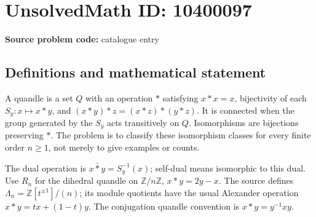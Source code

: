 \documentclass[11pt]{article}
\newcommand{\Z}{\mathbb{Z}}
\begin{document}
\section*{UnsolvedMath ID: 10400097}
\textbf{Source problem code:} catalogue entry
\subsection{Definitions and mathematical statement}
A quandle is a set \(Q\) with an operation \(*\) satisfying \(x*x=x\), bijectivity of each \(S_y:x\mapsto x*y\), and \((x*y)*z=(x*z)*(y*z)\). It is connected when the group generated by the \(S_y\) acts transitively on \(Q\). Isomorphisms are bijections preserving \(*\). The problem is to classify these isomorphism classes for every finite order \(n\geq1\), not merely to give examples or counts.

The dual operation is \(x\mathbin{\bar *}y=S_y^{-1}(x)\); self-dual means isomorphic to this dual. Use \(R_n\) for the dihedral quandle on \(\Z/n\Z\), \(x*y=2y-x\). The source defines \(\Lambda_n=\Z[t^{\pm1}]/(n)\); its module quotients have the usual Alexander operation \(x*y=tx+(1-t)y\). The conjugation quandle convention is \(x*y=y^{-1}xy\).
\end{document}
